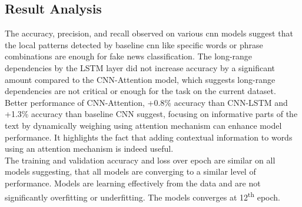 \subsection{Result Analysis}
The accuracy, precision, and recall observed on various \ac{cnn} models suggest that the local patterns detected by baseline \ac{cnn} like specific words or phrase combinations are enough for fake news classification. The long-range dependencies by the LSTM layer did not increase accuracy by a significant amount compared to the CNN-Attention model, which suggests long-range dependencies are not critical or enough for the task on the current dataset. Better performance of CNN-Attention, +0.8\% accuracy than CNN-LSTM and +1.3\% accuracy than baseline CNN suggest, focusing on informative parts of the text by dynamically weighing using attention mechanism can enhance model performance. It highlights the fact that adding contextual information to words using an attention mechanism is indeed useful. \\

The training and validation accuracy and loss over epoch are similar on all models suggesting, that all models are converging to a similar level of performance. Models are learning effectively from the data and are not significantly overfitting or underfitting. The models converges at 12\textsuperscript{th} epoch.

